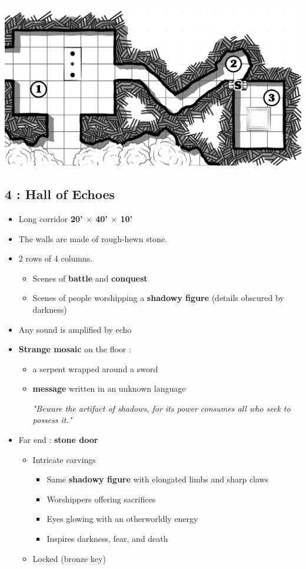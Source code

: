 \vfill
\includegraphics[width=\linewidth]{pics/map_1-3.png}

\subsection{4 : Hall of Echoes}\label{l1:r4}
\begin{itemize}
  \item Long corridor \textbf{20' $\times$ 40' $\times$ 10'}
  \item The walls are made of rough-hewn stone.
  \item 2 rows of 4 columns.
  \begin{itemize}
    \item Scenes of \textbf{battle} and \textbf{conquest}
    \item Scenes of people worshipping a \textbf{shadowy figure} (details obscured by darkness)
  \end{itemize}
  \item Any sound is amplified by echo
  \item \textbf{Strange mosaic} on the floor : 
  \begin{itemize}
    \item a serpent wrapped around a sword
    \item \textbf{message} written in an unknown language
    \begin{highlight}
      \emph{"Beware the artifact of shadows, for its power consumes all who seek to possess it."}
    \end{highlight}
  \end{itemize}
  \item Far end : \textbf{stone door}
  \begin{itemize}
    \item Intricate carvings
    \begin{itemize}
      \item Same \textbf{shadowy figure} with elongated limbs and sharp claws
      \item Worshippers offering sacrifices
      \item Eyes glowing with an otherworldly energy
      \item Inspires darkness, fear, and death
    \end{itemize}
    \item Locked (bronze key)
  \end{itemize}
\end{itemize}

